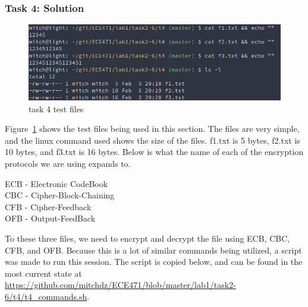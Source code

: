 \documentclass[12pt]{article}
\newcommand\tab[1][0.5cm]{\hspace*{#1}}
\begin{document}
\subsubsection{Task 4: Solution}
\begin{figure}[H]
    \begin{center}
        \includegraphics[scale=0.65]{t4p0.png}
    \end{center}{}
    \caption{task 4 test files}
    \label{fig:t4p0}
\end{figure}

Figure~\ref{fig:t4p0} shows the test files being used in this section. The files are very simple, and the linux command used shows the size of the files. f1.txt is 5 bytes, f2.txt is 10 bytes, and f3.txt is 16 bytes. Below is what the name of each of the encryption protocols we are using expands to.

\tab ECB - Electronic CodeBook \\
\tab CBC - Cipher-Block-Chaining \\
\tab CFB - Cipher-Feedback \\
\tab OFB - Output-FeedBack


To these three files, we need to encrypt and decrypt the file using ECB, CBC, CFB, and OFB. Because this is a lot of similar commands being utilized, a script was made to run this session. The script is copied below, and can be found in the most current state at \url{https://github.com/mitchdz/ECE471/blob/master/lab1/task2-6/t4/t4_commands.sh}.
\end{document}
